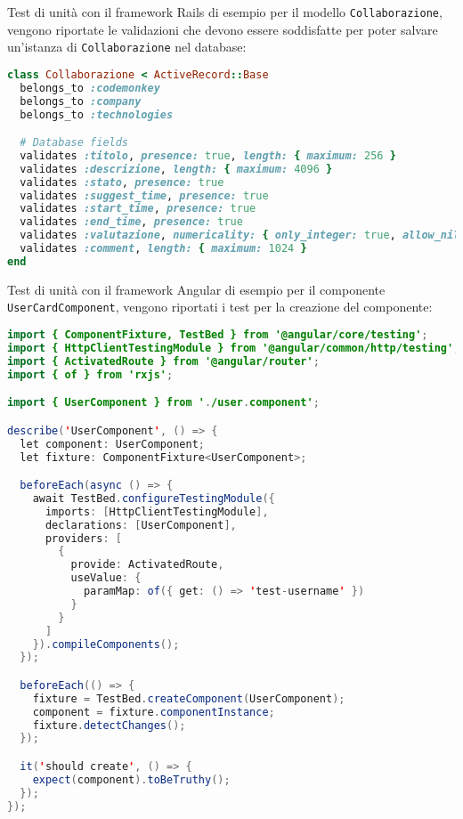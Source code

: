 
Test di unità con il framework Rails di esempio per il modello \texttt{Collaborazione}, vengono riportate le validazioni che devono essere soddisfatte per poter salvare un'istanza di \texttt{Collaborazione} nel database:

\begin{lstlisting}[language=Ruby]
class Collaborazione < ActiveRecord::Base
  belongs_to :codemonkey
  belongs_to :company
  belongs_to :technologies

  # Database fields
  validates :titolo, presence: true, length: { maximum: 256 }
  validates :descrizione, length: { maximum: 4096 }
  validates :stato, presence: true
  validates :suggest_time, presence: true
  validates :start_time, presence: true
  validates :end_time, presence: true
  validates :valutazione, numericality: { only_integer: true, allow_nil: true, greater_than_or_equal_to: 0, less_than_or_equal_to: 5 } 
  validates :comment, length: { maximum: 1024 }
end
\end{lstlisting}

Test di unità con il framework Angular di esempio per il componente \texttt{UserCardComponent}, vengono riportati i test per la creazione del componente:

\begin{lstlisting}[language=Java]
import { ComponentFixture, TestBed } from '@angular/core/testing';
import { HttpClientTestingModule } from '@angular/common/http/testing';
import { ActivatedRoute } from '@angular/router';
import { of } from 'rxjs';

import { UserComponent } from './user.component';

describe('UserComponent', () => {
  let component: UserComponent;
  let fixture: ComponentFixture<UserComponent>;

  beforeEach(async () => {
    await TestBed.configureTestingModule({
      imports: [HttpClientTestingModule],
      declarations: [UserComponent],
      providers: [
        {
          provide: ActivatedRoute,
          useValue: {
            paramMap: of({ get: () => 'test-username' })
          }
        }
      ]
    }).compileComponents();
  });

  beforeEach(() => {
    fixture = TestBed.createComponent(UserComponent);
    component = fixture.componentInstance;
    fixture.detectChanges();
  });

  it('should create', () => {
    expect(component).toBeTruthy();
  });
});
\end{lstlisting}


